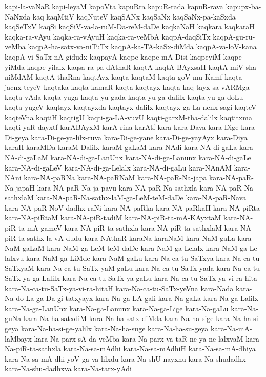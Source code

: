 {kapi-la-vaNaR
kapi-leyaM
kapoVta
kapuRra
kapuR-rada
kapuR-rava
kapupx-ba-NaNxda
kaq
kaqMtiV
kaqNuteV
kaqSANx
kaqSaNx
kaqSaNx-pa-kaSxda
kaqSeTxV
kaqSi
kaqSiV-va-la-ruM-Da-reM-daDe
kaqkaNaH
kaqkara
kaqkaraH
kaqka-ra-vAyu
kaqka-ra-vAyuH
kaqka-ra-veMbA
kaqpA-daqSiTx
kaqpA-gu-ru-veMba
kaqpA-ha-satx-va-niTuTx
kaqpA-ka-TA-kaSx-diMda
kaqpA-va-loV-kana
kaqpA-vi-SaTx-nA-gidudx
kaqpayA
kaqpe
kaqpe-mA-Disi
kaqpeyiM
kaqpe-yiMda
kaqpe-yilalx
kaqsa-ra-pa-dAthaR
kaqtA
kaqtA-BAyxsaH
kaqtA-miV-sha-niMdAM
kaqtA-thaRna
kaqtAvx
kaqta
kaqtaM
kaqta-goV-mu-Kamf
kaqta-jacnx-teyeV
kaqtaka
kaqta-kamaR
kaqta-kaqtayx
kaqta-kaq-tayx-sa-vARMga
kaqta-vAda
kaqta-yuga
kaqta-yu-gada
kaqta-yu-ga-dalilx
kaqta-yu-ga-doLu
kaqta-yugeV
kaqtayx
kaqtayxda
kaqtayx-dalilx
kaqtayx-ga-La-nenx-sagi
kaqteV
kaqteVna
kaqtiH
kaqtigU
kaqti-ga-LA-vuvU
kaqti-garxM-tha-dalilx
kaqtitxma
kaqti-yaR-dayxtf
karABAyxM
karA-rina
karAtf
kara
kara-Dava
kara-Dige
kara-Di-geya
kara-Di-ge-ya-lilx-ruva
kara-Di-ge-yane
kara-Di-ge-yayAyx
kara-Diya
karaH
karaMDa
karaM-Dalilx
karaM-gaLaM
kara-NAdi
kara-NA-di-gaLa
kara-NA-di-gaLaM
kara-NA-di-ga-LanUnx
kara-NA-di-ga-Lanunx
kara-NA-di-gaLe
kara-NA-di-gaLeV
kara-NA-di-ga-Lelalx
kara-NA-di-gaLu
kara-NAnAM
kara-NAni
kara-NA-paRNa
kara-NA-paRNaM
kara-NA-paR-Na-japa
kara-NA-paR-Na-japaH
kara-NA-paR-Na-ja-pavu
kara-NA-paR-Na-sathxla
kara-NA-paR-Na-sathxlaM
kara-NA-paR-Na-sathx-laM-ga-LeM-teM-daDe
kara-NA-paR-Nava
kara-NA-paR-NoV-dadhx-raNi
kara-NA-paRka
kara-NA-paRkaH
kara-NA-piRta
kara-NA-piRtaM
kara-NA-piR-tadiM
kara-NA-piR-ta-mA-KAyxtaM
kara-NA-piR-ta-mA-gameV
kara-NA-piR-ta-sathxla
kara-NA-piR-ta-sathxlaM
kara-NA-piR-ta-sathx-la-vA-dudu
kara-NAthaR
karaNa
karaNaM
kara-NaM-gaLa
kara-NaM-gaLaM
kara-NaM-ga-LeM-teM-daDe
kara-NaM-ga-Lelalx
kara-NaM-ga-Le-lalxvu
kara-NaM-ga-LiMde
kara-NaM-gaLu
kara-Na-ca-tu-SaTxya
kara-Na-ca-tu-SaTxyaM
kara-Na-ca-tu-SaTx-yaM-gaLu
kara-Na-ca-tu-SaTx-yada
kara-Na-ca-tu-SaTx-ya-ga-Lalilx
kara-Na-ca-tu-SaTx-ya-gaLu
kara-Na-ca-tu-SaTx-ya-vi-ra-hita
kara-Na-ca-tu-SaTx-ya-vi-ra-hitaH
kara-Na-ca-tu-SaTx-yeVna
kara-Nada
kara-Na-do-La-ga-Da-gi-tatxyayx
kara-Na-ga-LA-gali
kara-Na-gaLa
kara-Na-ga-Lalilx
kara-Na-ga-LanUnx
kara-Na-ga-Lanunx
kara-Na-ga-Lige
kara-Na-gaLu
kara-Na-guNa
kara-Na-ha-satxdiM
kara-Na-ha-satx-diMda
kara-Na-ha-sige
kara-Na-ha-si-geya
kara-Na-ha-si-ge-yalilx
kara-Na-ha-suge
kara-Na-ha-su-geya
kara-Na-mA-laMbayx
kara-Na-parx-sA-da-veMba
kara-Na-parx-va-taR-ne-ya-ne-lalxvaM
kara-Na-piR-ta-sathxla
kara-Na-sa-mAdhi
kara-Na-sa-mAdhiH
kara-Na-sa-mA-dhiya
kara-Na-sa-mA-dhi-yoV-ga-va-lilxdu
kara-Na-shU-nayxnu
kara-Na-shudadhx
kara-Na-shu-dadhxva
kara-Na-tarx-yAdi
}
